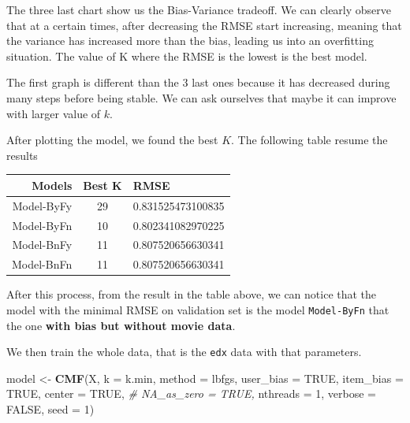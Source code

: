 \documentclass[
]{article}
\newenvironment{Shaded}{\begin{snugshade}}{\end{snugshade}}
\newcommand{\AttributeTok}[1]{\textcolor[rgb]{0.13,0.29,0.53}{#1}}
\newcommand{\CommentTok}[1]{\textcolor[rgb]{0.56,0.35,0.01}{\textit{#1}}}
\newcommand{\ConstantTok}[1]{\textcolor[rgb]{0.56,0.35,0.01}{#1}}
\newcommand{\DecValTok}[1]{\textcolor[rgb]{0.00,0.00,0.81}{#1}}
\newcommand{\FunctionTok}[1]{\textcolor[rgb]{0.13,0.29,0.53}{\textbf{#1}}}
\newcommand{\NormalTok}[1]{#1}
\newcommand{\OtherTok}[1]{\textcolor[rgb]{0.56,0.35,0.01}{#1}}
\newcommand{\StringTok}[1]{\textcolor[rgb]{0.31,0.60,0.02}{#1}}
\begin{document}
The three last chart show us the Bias-Variance tradeoff. We can clearly
observe that at a certain times, after decreasing the RMSE start
increasing, meaning that the variance has increased more than the bias,
leading us into an overfitting situation. The value of K where the RMSE
is the lowest is the best model.

The first graph is different than the 3 last ones because it has
decreased during many steps before being stable. We can ask ourselves
that maybe it can improve with larger value of \(k\).

After plotting the model, we found the best \(K\). The following table
resume the results

\begin{longtable}[]{@{}rcl@{}}
\toprule\noalign{}
Models & Best K & RMSE \\
\midrule\noalign{}
\endhead
\bottomrule\noalign{}
\endlastfoot
Model-ByFy & 29 & 0.831525473100835 \\
Model-ByFn & 10 & 0.802341082970225 \\
Model-BnFy & 11 & 0.807520656630341 \\
Model-BnFn & 11 & 0.807520656630341 \\
\end{longtable}

After this process, from the result in the table above, we can notice
that the model with the minimal RMSE on validation set is the model
\texttt{Model-ByFn} that the one \textbf{with bias but without movie
data}.

We then train the whole data, that is the \texttt{edx} data with that
parameters.

\begin{Shaded}
\begin{Highlighting}[]
\NormalTok{model }\OtherTok{\textless{}{-}} \FunctionTok{CMF}\NormalTok{(X, }\AttributeTok{k =}\NormalTok{ k.min, }\AttributeTok{method =} \StringTok{\textquotesingle{}lbfgs\textquotesingle{}}\NormalTok{,}
            \AttributeTok{user\_bias =} \ConstantTok{TRUE}\NormalTok{, }\AttributeTok{item\_bias =} \ConstantTok{TRUE}\NormalTok{,}
            \AttributeTok{center =} \ConstantTok{TRUE}\NormalTok{,}
            \CommentTok{\# NA\_as\_zero = TRUE, }
            \AttributeTok{nthreads =} \DecValTok{1}\NormalTok{, }\AttributeTok{verbose =} \ConstantTok{FALSE}\NormalTok{, }\AttributeTok{seed =} \DecValTok{1}\NormalTok{)}
\end{Highlighting}
\end{Shaded}
\end{document}
